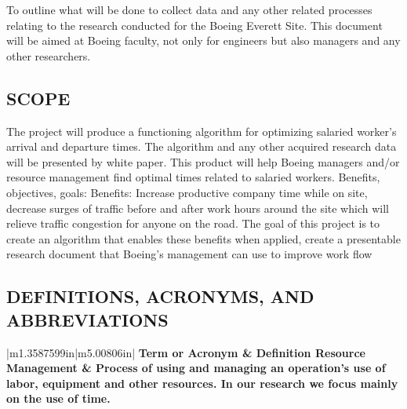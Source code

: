 \documentclass[twoside,letterpaper]{article}
\makeatletter
\newcommand\arraybslash{\let\\\@arraycr}
\makeatother
\begin{document}
{\color{black}
To outline what will be done to collect data and any other related processes relating to the research conducted for the Boeing Everett Site. This document will be aimed at Boeing faculty, not only for engineers but also managers and any other researchers.}


\subsection[SCOPE]{\rmfamily\bfseries\color{black}
SCOPE}

{\color{black}
The project will produce a functioning algorithm for optimizing salaried worker’s arrival and departure times.
The algorithm and any other acquired research data will be presented by white paper.
This product will help Boeing managers and/or resource management find optimal times related to salaried workers.
Benefits, objectives, goals:	
Benefits: Increase productive company time while on site, decrease surges of traffic before and after work hours around the site which will relieve traffic congestion for anyone on the road. The goal of this project is to create an algorithm that enables these benefits when applied, create a presentable research document that Boeing’s management can use to improve work flow
}


\subsection[DEFINITIONS, ACRONYMS, AND
ABBREVIATIONS]{\rmfamily\bfseries\color{black}
DEFINITIONS, ACRONYMS, AND ABBREVIATIONS}



\begin{flushleft}
\tablehead{}
\begin{supertabular}{|m{1.3587599in}|m{5.00806in}|}
\hline
\centering {}\bfseries\color{black} Term or
Acronym &
\centering\arraybslash {}\bfseries\color{black}
Definition\\\hline
{}\color{black}Resource Management &
\color{black} Process of using and managing an operation’s use of labor, equipment and other resources. In our research we focus mainly on the use of time.
\\\hline

\end{supertabular}
\end{flushleft}
\end{document}
